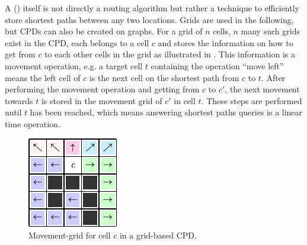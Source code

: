 			A  () itself is not directly a routing algorithm but rather a technique to efficiently store shortest paths between any two locations\cite{botea-cpd-2013}.
			Grids are used in the following, but CPDs can also be created on graphs.
			For a grid of $n$ cells, $n$ many such grids exist in the CPD, each belongs to a cell $c$ and stores the information on how to get from $c$ to each other cells in the grid as illustrated in .
			This information is a movement operation, e.g. a target cell $t$ containing the operation \enquote{move left} means the left cell of $c$ is the next cell on the shortest path from $c$ to $t$.
			After performing the movement operation and getting from $c$ to $c'$, the next movement towards $t$ is stored in the movement grid of $c'$ in cell $t$.
			These steps are performed until $t$ has been reached, which means answering shortest paths queries is a linear time operation.
			
			\begin{figure}
				\vspace{-1.5\baselineskip}
				\includegraphics[width=\linewidth]{images/botea-cpd.pdf}
				\caption[Movement information in grid-based CPD.]{Movement-grid for cell $c$ in a grid-based CPD\cite{botea-cpd-2013}.}
				\label{fig:cpd}
			\end{figure}
			
